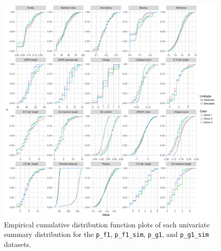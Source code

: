 \documentclass{article}
\begin{document}
\begin{figure}
    \includegraphics[width=\linewidth]{Figures/IgorScores/igor_ecdf.pdf}
    \caption{Empirical cumulative distribution function plots of each univariate summary distribution for the \texttt{p\_f1}, \texttt{p\_f1\_sim}, \texttt{p\_g1}, and \texttt{p\_g1\_sim} datasets.}
    \label{fig:IgorECDFs}
\end{figure}
\end{document}
